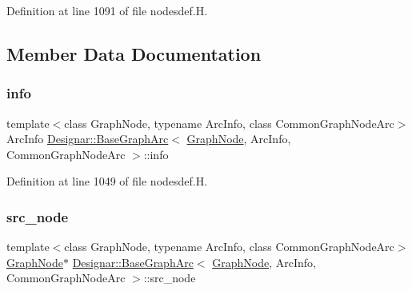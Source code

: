 Definition at line 1091 of file nodesdef.\+H.



\subsection{Member Data Documentation}
\mbox{\label{class_designar_1_1_base_graph_arc_a8aacc596a2fbca49cc927d6eaac595aa}} 
\subsubsection{\texorpdfstring{info}{info}}
{\footnotesize\ttfamily template$<$class Graph\+Node, typename Arc\+Info, class Common\+Graph\+Node\+Arc$>$ \\
Arc\+Info \hyperlink{class_designar_1_1_base_graph_arc}{Designar\+::\+Base\+Graph\+Arc}$<$ \hyperlink{class_designar_1_1_graph_node}{Graph\+Node}, Arc\+Info, Common\+Graph\+Node\+Arc $>$\+::info\hspace{0.3cm}{\ttfamily [protected]}}



Definition at line 1049 of file nodesdef.\+H.

\mbox{\label{class_designar_1_1_base_graph_arc_a3d62765087127c26045bfae7a3c5f6f8}} 
\subsubsection{\texorpdfstring{src\+\_\+node}{src\_node}}
{\footnotesize\ttfamily template$<$class Graph\+Node, typename Arc\+Info, class Common\+Graph\+Node\+Arc$>$ \\
\hyperlink{class_designar_1_1_graph_node}{Graph\+Node}$\ast$ \hyperlink{class_designar_1_1_base_graph_arc}{Designar\+::\+Base\+Graph\+Arc}$<$ \hyperlink{class_designar_1_1_graph_node}{Graph\+Node}, Arc\+Info, Common\+Graph\+Node\+Arc $>$\+::src\+\_\+node\hspace{0.3cm}{\ttfamily [protected]}}



